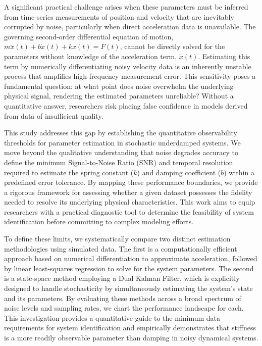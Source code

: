 \documentclass[]{article}
\begin{document}
A significant practical challenge arises when these parameters must be inferred from time-series measurements of position and velocity that are inevitably corrupted by noise, particularly when direct acceleration data is unavailable. The governing second-order differential equation of motion, $m\ddot{x}(t) + b\dot{x}(t) + kx(t) = F(t)$, cannot be directly solved for the parameters without knowledge of the acceleration term, $\ddot{x}(t)$. Estimating this term by numerically differentiating noisy velocity data is an inherently unstable process that amplifies high-frequency measurement error. This sensitivity poses a fundamental question: at what point does noise overwhelm the underlying physical signal, rendering the estimated parameters unreliable? Without a quantitative answer, researchers risk placing false confidence in models derived from data of insufficient quality.

This study addresses this gap by establishing the quantitative observability thresholds for parameter estimation in stochastic underdamped systems. We move beyond the qualitative understanding that noise degrades accuracy to define the minimum Signal-to-Noise Ratio (SNR) and temporal resolution required to estimate the spring constant ($k$) and damping coefficient ($b$) within a predefined error tolerance. By mapping these performance boundaries, we provide a rigorous framework for assessing whether a given dataset possesses the fidelity needed to resolve its underlying physical characteristics. This work aims to equip researchers with a practical diagnostic tool to determine the feasibility of system identification before committing to complex modeling efforts.

To define these limits, we systematically compare two distinct estimation methodologies using simulated data. The first is a computationally efficient approach based on numerical differentiation to approximate acceleration, followed by linear least-squares regression to solve for the system parameters. The second is a state-space method employing a Dual Kalman Filter, which is explicitly designed to handle stochasticity by simultaneously estimating the system's state and its parameters. By evaluating these methods across a broad spectrum of noise levels and sampling rates, we chart the performance landscape for each. This investigation provides a quantitative guide to the minimum data requirements for system identification and empirically demonstrates that stiffness is a more readily observable parameter than damping in noisy dynamical systems.
\end{document}
